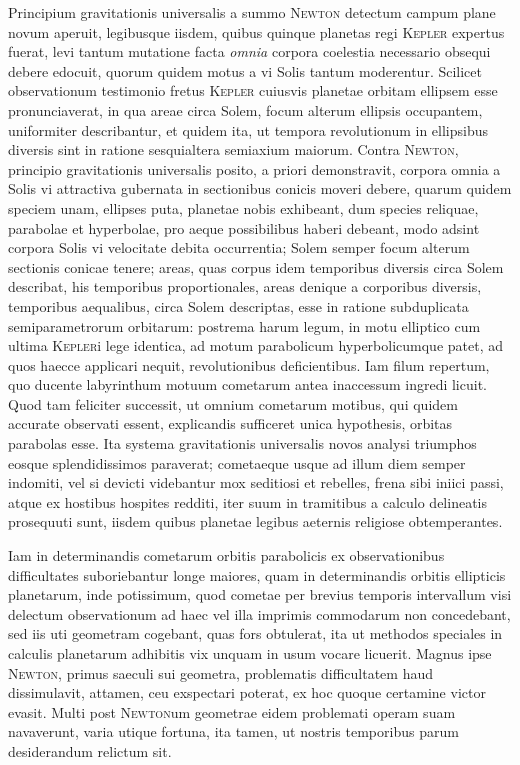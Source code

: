 Principium gravitationis universalis a summo \textsc{Newton} detectum campum plane novum aperuit, legibusque iisdem, quibus quinque planetas regi \textsc{Kepler} expertus fuerat, levi tantum mutatione facta \emph{omnia} corpora coelestia necessario
obsequi debere edocuit, quorum quidem motus a vi Solis tantum moderentur. Scilicet observationum testimonio fretus \textsc{Kepler} cuiusvis planetae orbitam ellipsem esse pronunciaverat, in qua areae circa Solem, focum alterum ellipsis occupantem, uniformiter describantur, et quidem ita, ut tempora revolutionum in ellipsibus diversis sint in ratione sesquialtera semiaxium maiorum. Contra \textsc{Newton}, principio gravitationis universalis posito, a priori demonstravit, corpora omnia a Solis vi attractiva gubernata in sectionibus conicis moveri debere, quarum quidem speciem unam, ellipses puta, planetae nobis exhibeant, dum species reliquae, parabolae et hyperbolae, pro aeque possibilibus haberi debeant, modo adsint corpora Solis vi velocitate debita occurrentia; Solem semper focum alterum sectionis conicae tenere; areas, quas corpus idem temporibus diversis circa Solem describat, his temporibus proportionales, areas denique a corporibus diversis, temporibus aequalibus, circa Solem descriptas, esse in ratione subduplicata semiparametrorum orbitarum: postrema harum legum, in motu elliptico cum ultima \textsc{Kepler}i lege identica, ad motum parabolicum hyperbolicumque patet, ad quos haecce applicari nequit, revolutionibus deficientibus. Iam filum repertum, quo ducente labyrinthum motuum cometarum antea inaccessum ingredi licuit. Quod tam feliciter successit, ut omnium cometarum motibus, qui quidem accurate observati essent, explicandis sufficeret unica hypothesis, orbitas parabolas esse. Ita systema gravitationis universalis novos analysi triumphos eosque splendidissimos paraverat; cometaeque usque ad illum diem semper indomiti, vel si devicti videbantur mox seditiosi et rebelles, frena sibi iniici passi, atque ex hostibus hospites redditi, iter suum in tramitibus a calculo delineatis prosequuti sunt, iisdem quibus planetae legibus aeternis religiose obtemperantes.

Iam in determinandis cometarum orbitis parabolicis ex observationibus difficultates suboriebantur longe maiores, quam in determinandis orbitis ellipticis planetarum, inde potissimum, quod cometae per brevius temporis 
intervallum visi delectum observationum ad haec vel illa imprimis commodarum non concedebant, sed iis uti geometram cogebant, quas fors obtulerat, ita ut methodos speciales in calculis planetarum adhibitis vix unquam in usum vocare licuerit. Magnus ipse \textsc{Newton}, primus saeculi sui geometra, problematis difficultatem haud dissimulavit, attamen, ceu exspectari poterat, ex hoc quoque certamine victor evasit. Multi post \textsc{Newton}um geometrae eidem problemati operam suam navaverunt, varia utique fortuna, ita tamen, ut nostris temporibus parum desiderandum relictum sit.

